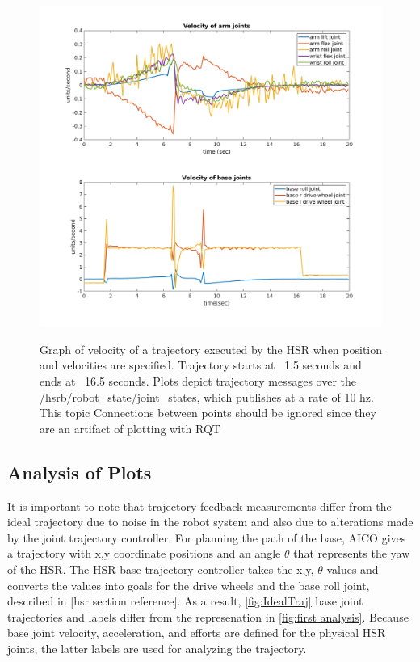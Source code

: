 \documentclass[12pt]{article}
\begin{document}
        \begin{figure}
            \centering
            \includegraphics[width=\linewidth]{2020.04.01/vel_joints.png}
            \label{fig:veljoints}
            \caption{Graph of velocity of a trajectory executed by the HSR when position and velocities are specified. Trajectory starts at ~1.5 seconds and ends at ~16.5 seconds. Plots depict trajectory messages over the /hsrb/robot\_state/joint\_states, which publishes at a rate of 10 hz. This topic Connections between points should be ignored since they are an artifact of plotting with RQT}
        \end{figure}
        


    \subsection{Analysis of Plots}
        It is important to note that trajectory feedback measurements differ from the ideal trajectory due to noise in the robot system and also due to alterations made by the joint trajectory controller. 
        For planning the path of the base, AICO gives a trajectory with x,y coordinate positions and an angle \(\theta\) that represents the yaw of the HSR. The HSR base trajectory controller takes the x,y, \(\theta\) values and converts the values into goals for the drive wheels and the base roll joint, described in [hsr section reference]. As a result, \cref{fig:IdealTraj} base joint trajectories and labels differ from the represenation in \cref{fig:first analysis}. Because base joint velocity, acceleration, and efforts are defined for the physical HSR joints, the latter labels are used for analyzing the trajectory.
\end{document}
